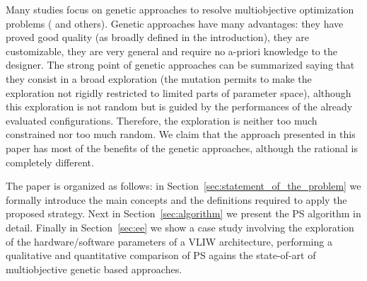 Many studies focus on genetic approaches to resolve multiobjective
optimization problems (\cite{coello_easmop} and others). Genetic approaches
have many advantages: they have proved good quality (as broadly defined
in the introduction), they are customizable, they are very general
and require no a-priori knowledge to the designer.  The strong
point of genetic approaches can be summarized saying that they consist
in a broad exploration (the mutation permits to make the exploration
not rigidly restricted to limited parts of parameter space), although
this exploration is not random but is guided by the performances of
the already evaluated configurations. Therefore, the exploration is
neither too much constrained nor too much random. We claim that the
approach presented in this paper has most of the benefits of the genetic
approaches, although the rational is completely different.

The paper is organized as follows: in
Section~\ref{sec:statement_of_the_problem} we formally introduce the
main concepts and the definitions required to apply the proposed strategy. Next in
Section~\ref{sec:algorithm} we present the PS algorithm in detail.
Finally in Section~\ref{sec:ee} we show a case study involving the
exploration of the hardware/software parameters of a VLIW
architecture, performing a qualitative and quantitative comparison of
PS agains the state-of-art of multiobjective genetic based approaches.
